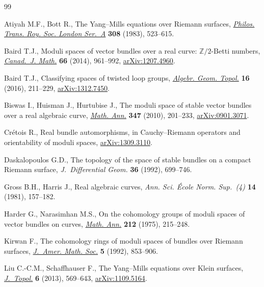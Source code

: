 \begin{thebibliography}{99}
\footnotesize\itemsep=0pt

Atiyah M.F., Bott R., The {Y}ang--{M}ills equations over {R}iemann surfaces,
 \href{http://dx.doi.org/10.1098/rsta.1983.0017}{\textit{Philos. Trans. Roy. Soc. London Ser.~A}} \textbf{308} (1983),
 523--615.

Baird T.J., Moduli spaces of vector bundles over a real curve:
 {$\mathbb{Z}/2$}-{B}etti numbers, \href{http://dx.doi.org/10.4153/CJM-2013-049-1}{\textit{Canad.~J. Math.}} \textbf{66}
 (2014), 961--992, \href{http://arxiv.org/abs/1207.4960}{arXiv:1207.4960}.

Baird T.J., Classifying spaces of twisted loop groups, \href{http://dx.doi.org/10.2140/agt.2016.16.211}{\textit{Algebr. Geom.
 Topol.}} \textbf{16} (2016), 211--229, \href{http://arxiv.org/abs/1312.7450}{arXiv:1312.7450}.

Biswas I., Huisman J., Hurtubise J., The moduli space of stable vector bundles
 over a real algebraic curve, \href{http://dx.doi.org/10.1007/s00208-009-0442-5}{\textit{Math. Ann.}} \textbf{347} (2010),
 201--233, \href{http://arxiv.org/abs/0901.3071}{arXiv:0901.3071}.

Cr{\'e}tois R., Real bundle automorphisms, in {C}auchy--{R}iemann operators and
 orientability of moduli spaces, \href{http://arxiv.org/abs/1309.3110}{arXiv:1309.3110}.

Daskalopoulos G.D., The topology of the space of stable bundles on a compact
 {R}iemann surface, \textit{J.~Diffe\-ren\-tial Geom.} \textbf{36} (1992),
 699--746.

Gross B.H., Harris J., Real algebraic curves, \textit{Ann. Sci. \'Ecole Norm.
 Sup.~(4)} \textbf{14} (1981), 157--182.

Harder G., Narasimhan M.S., On the cohomology groups of moduli spaces of vector
 bundles on curves, \href{http://dx.doi.org/10.1007/BF01357141}{\textit{Math. Ann.}} \textbf{212} (1975), 215--248.

Kirwan F., The cohomology rings of moduli spaces of bundles over {R}iemann
 surfaces, \href{http://dx.doi.org/10.2307/2152712}{\textit{J.~Amer. Math. Soc.}} \textbf{5} (1992), 853--906.

Liu C.-C.M., Schaf\/fhauser F., The {Y}ang--{M}ills equations over {K}lein
 surfaces, \href{http://dx.doi.org/10.1112/jtopol/jtt001}{\textit{J.~Topol.}} \textbf{6} (2013), 569--643, \href{http://arxiv.org/abs/1109.5164}{arXiv:1109.5164}.


\end{thebibliography}
